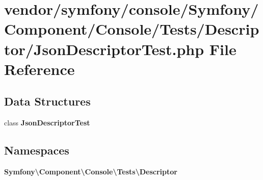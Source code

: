 \section{vendor/symfony/console/\+Symfony/\+Component/\+Console/\+Tests/\+Descriptor/\+Json\+Descriptor\+Test.php File Reference}
\label{_json_descriptor_test_8php}
\subsection*{Data Structures}
\begin{DoxyCompactItemize}
\item 
class {\bf Json\+Descriptor\+Test}
\end{DoxyCompactItemize}
\subsection*{Namespaces}
\begin{DoxyCompactItemize}
\item 
 {\bf Symfony\textbackslash{}\+Component\textbackslash{}\+Console\textbackslash{}\+Tests\textbackslash{}\+Descriptor}
\end{DoxyCompactItemize}
